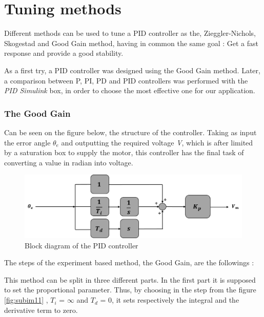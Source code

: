 \section{Tuning methods}
Different methods can be used to tune a PID controller as the, Zieggler-Nichols, Skogestad and Good Gain method, having in common the same goal : Get a fast response and provide a good stability.\par
As a first try, a PID controller was designed using the Good Gain method. Later, a comparison between P, PI, PD and PID controllers was performed with the \emph{PID Simulink} box, in order to choose the most effective one for our application.\par 	

\subsubsection{The Good Gain}


Can be seen on the figure below, the structure of the controller. Taking as input the error angle \textbf{$\theta_{e}$} and outputting the required voltage \textit{V}, which is after limited by a saturation box to supply the motor, this controller has the final task of converting a value in radian into voltage.\par

\begin{figure}[H]
  \centering
  \includegraphics[scale=0.5]{figures/controller_model.png}
  \caption[LABEL] {Block diagram of the PID controller}
\end{figure}
  

  
    
The steps of the experiment based method, the Good Gain, are the followings :\par 

 This method can be split in three different parts. In the first part it is supposed to set the proportional parameter. Thus, by choosing in the step from the figure \ref{fig:subim11} , $T_i$ = $\infty$ and $T_d$ = 0, it sets respectively the integral and the derivative term to zero.

